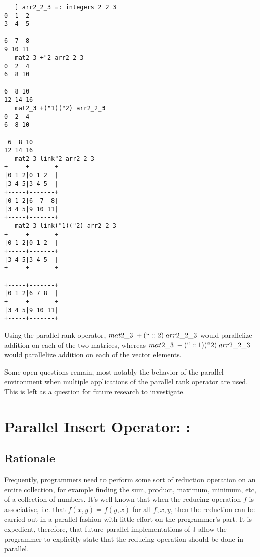 \begin{singlespacing}
\begin{small}
\begin{verbatim}
   ] arr2_2_3 =: integers 2 2 3
0  1  2
3  4  5

6  7  8
9 10 11
   mat2_3 +"2 arr2_2_3
0  2  4
6  8 10

6  8 10
12 14 16
   mat2_3 +("1)("2) arr2_2_3
0  2  4
6  8 10

 6  8 10
12 14 16
   mat2_3 link"2 arr2_2_3
+-----+-------+
|0 1 2|0 1 2  |
|3 4 5|3 4 5  |
+-----+-------+
|0 1 2|6  7  8|
|3 4 5|9 10 11|
+-----+-------+
   mat2_3 link("1)("2) arr2_2_3
+-----+-------+
|0 1 2|0 1 2  |
+-----+-------+
|3 4 5|3 4 5  |
+-----+-------+

+-----+-------+
|0 1 2|6 7 8  |
+-----+-------+
|3 4 5|9 10 11|
+-----+-------+
\end{verbatim}
\end{small}
\end{singlespacing}


Using the parallel rank operator, 
$mat2\_3\;+(``::2)\;arr2\_2\_3$ would parallelize addition on each of the two matrices, whereas
$mat2\_3\;+(``::1)(``2)\;arr2\_2\_3$ would parallelize addition on each of the vector elements.

Some open questions remain, most notably 
the behavior of the parallel environment when multiple applications of the parallel rank operator are used. 
This is left as a question for future research to investigate.

\section{Parallel Insert Operator: \ttfamily \:: \normalfont}
\label{pins}
\subsection{Rationale}
Frequently, programmers need to perform some sort of reduction operation on an entire collection, 
for example finding the sum, product, maximum, minimum, etc, of a collection of numbers.
It's well known that when the reducing operation $f$ is associative, i.e. that $f(x,y) = f(y,x)$ for all $f, x, y$, 
then the reduction can be carried out in a parallel fashion with little effort on the programmer's part.
It is expedient, therefore, that future parallel implementations of J allow the programmer 
to explicitly state that the reducing operation should be done in parallel.

